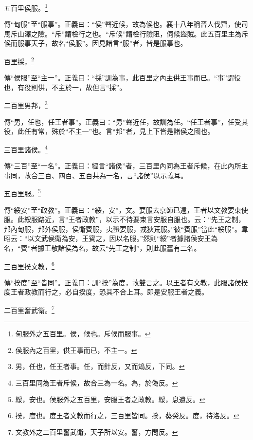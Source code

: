 五百里侯服。\footnote{甸服外之五百里。侯，候也。斥候而服事。}

{\noindent\zhuan{}\fzbyks 傳“甸服”至“服事”。正義曰：“侯”聲近候，故為候也。襄十八年稱晉人伐齊，使司馬斥山澤之險。“斥”謂檢行之也。“斥候”謂檢行險阻，伺候盜賊。此五百里主為斥候而服事天子，故名“侯服”。因見諸言“服”者，皆是服事也。 \par}

百里採，\footnote{侯服內之百里，供王事而已，不主一。}

{\noindent\zhuan{}\fzbyks 傳“侯服”至“主一”。正義曰：“採”訓為事，此百里之內主供王事而已。“事”謂役也，有役則供，不主於一，故但言“採”。 \par}

二百里男邦，\footnote{男，任也，任王者事。任，而針反，又而鴆反，下同。}

{\noindent\zhuan{}\fzbyks 傳“男，任也，任王者事”。正義曰：“男”聲近任，故訓為任。“任王者事”，任受其役，此任有常，殊於“不主一”也。言“邦”者，見上下皆是諸侯之國也。 \par}

三百里諸侯。\footnote{三百里同為王者斥候，故合三為一名。為，於偽反。}

{\noindent\zhuan{}\fzbyks 傳“三百”至“一名”。正義曰：經言“諸侯”者，三百里內同為王者斥候，在此內所主事同，故合三百、四百、五百共為一名，言“諸侯”以示義耳。 \par}

五百里服。\footnote{綏，安也。侯服外之五百里，安服王者之政教。綏，息遺反。}

{\noindent\zhuan{}\fzbyks 傳“綏安”至“政教”。正義曰：“綏，安”，文。要服去京師已遠，王者以文教要束使服。此綏服路近，言“王者政教”，以示不待要束言安服自服也。云：“先王之制，邦內甸服，邦外侯服，侯衛賓服，夷蠻要服，戎狄荒服。”彼“賓服”當此“綏服”。韋昭云：“以文武侯衛為安，王賓之，因以名服。”然則“綏”者據諸侯安王為名，“賓”者據王敬諸侯為名，故云“先王之制”，則此服舊有二名。 \par}

三百里揆文教，\footnote{揆，度也。度王者文教而行之，三百里皆同。揆，葵癸反。度，待洛反。}

{\noindent\zhuan{}\fzbyks 傳“揆度”至“皆同”。正義曰：訓“揆”為度，故雙言之。以王者有文教，此服諸侯揆度王者政教而行之，必自揆度，恐其不合上耳。即是安服王者之義。 \par}

二百里奮武衛。\footnote{文教外之二百里奮武衛，天子所以安。奮，方問反。}

